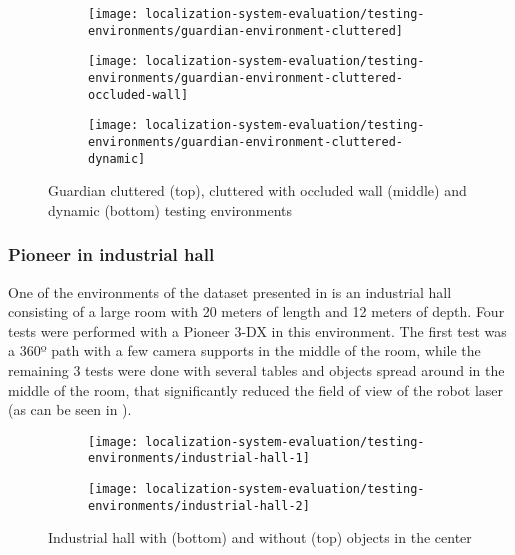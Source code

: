 \begin{figure}[H]
	\centering
	\begin{subfigure}[ht]{0.44\textwidth}
		\centering
		\texttt{[image: localization-system-evaluation/testing-environments/guardian-environment-cluttered]}
	\end{subfigure}
	\begin{subfigure}[ht]{0.44\textwidth}
		\centering
		\texttt{[image: localization-system-evaluation/testing-environments/guardian-environment-cluttered-occluded-wall]}
	\end{subfigure}
	\begin{subfigure}[ht]{0.44\textwidth}
		\centering
		\texttt{[image: localization-system-evaluation/testing-environments/guardian-environment-cluttered-dynamic]}
	\end{subfigure}
	\caption{Guardian cluttered (top), cluttered with occluded wall (middle) and dynamic (bottom) testing environments}
	\label{fig:localization-system-evaluation_guardian-tests-environment-cluttered}
\end{figure}



\subsubsection{Pioneer in industrial hall}

One of the environments of the dataset presented in \cite{Sturm2012} is an industrial hall consisting of a large room with 20 meters of length and 12 meters of depth. Four tests were performed with a Pioneer 3-DX in this environment. The first test was a 360º path with a few camera supports in the middle of the room, while the remaining 3 tests were done with several tables and objects spread around in the middle of the room, that significantly reduced the field of view of the robot laser (as can be seen in ).

\begin{figure}[H]
	\centering
	\begin{subfigure}[ht]{0.37\textwidth}
		\centering
		\texttt{[image: localization-system-evaluation/testing-environments/industrial-hall-1]}
	\end{subfigure}
	\begin{subfigure}[ht]{0.37\textwidth}
		\centering
		\texttt{[image: localization-system-evaluation/testing-environments/industrial-hall-2]}
	\end{subfigure}
	\caption{Industrial hall with (bottom) and without (top) objects in the center \cite{Sturm2012}}
	\label{fig:localization-system-evaluation_industrial-hall}
\end{figure}




